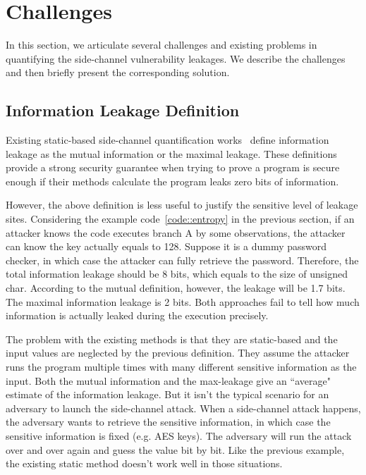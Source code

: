 \section{Challenges}

In this section, we articulate several challenges and existing problems
in quantifying the side-channel vulnerability leakages. We describe the
challenges and then briefly present the corresponding solution.

\subsection{Information Leakage Definition}
Existing static-based side-channel quantification works~\cite{182946} define information leakage
as the mutual information or the maximal leakage. These definitions provide a strong security guarantee
when trying to prove a program is secure enough if their methods calculate the program 
leaks zero bits of information.

However, the above definition is less useful to justify the sensitive level of leakage sites. 
Considering the example code~\ref{code::entropy} in the previous section, if an attacker knows the
code executes branch A by some observations, the attacker can know the key actually equals to 128. 
Suppose it is a dummy password checker, in which case the attacker can fully retrieve the password.
Therefore, the total information leakage should be 8 bits, which equals to the size
of unsigned char. 
According to the mutual definition, however, the leakage will be 1.7 bits. The maximal information
leakage is 2 bits. Both approaches fail to tell how much information is actually leaked
during the execution precisely.

The problem with the existing methods is that they are static-based and the 
input values are neglected by the previous definition. 
They assume the attacker runs the program multiple times with many different sensitive 
information as the input. Both the mutual information and the max-leakage give an ``average" 
estimate of the information leakage. But it isn't the typical scenario for an adversary to 
launch the side-channel attack. When a side-channel attack happens, the adversary wants 
to retrieve the sensitive information, in which case the sensitive information is fixed (e.g. AES keys). 
The adversary will run the attack over and over again and guess the value bit by bit. Like the 
previous example, the existing static method doesn’t work well in those situations.

